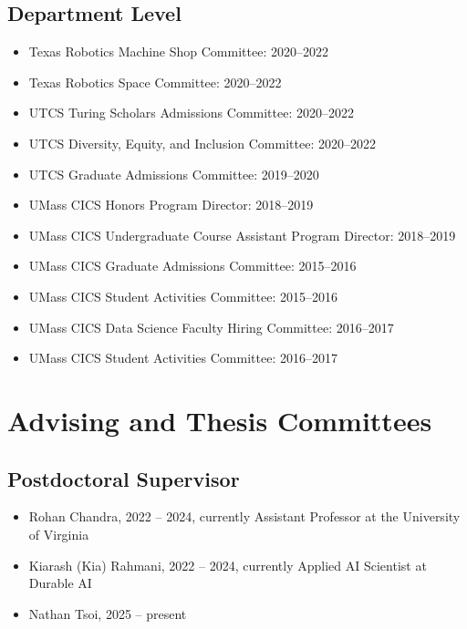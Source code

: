 \documentclass[Times]{article}
\begin{document}
\subsection*{Department Level}
\begin{itemize}
 \item Texas Robotics Machine Shop Committee: 2020--2022
 \item Texas Robotics Space Committee: 2020--2022
 \item UTCS Turing Scholars Admissions Committee: 2020--2022
 \item UTCS Diversity, Equity, and Inclusion Committee: 2020--2022
 \item UTCS Graduate Admissions Committee: 2019--2020
 \item UMass CICS Honors Program Director: 2018--2019
 \item UMass CICS Undergraduate Course Assistant Program Director: 2018--2019
 \item UMass CICS Graduate Admissions Committee: 2015--2016
 \item UMass CICS Student Activities Committee: 2015--2016
 \item UMass CICS Data Science Faculty Hiring Committee: 2016--2017
 \item UMass CICS Student Activities Committee: 2016--2017
\end{itemize}

\section*{Advising and Thesis Committees}

\subsection*{Postdoctoral Supervisor}
\begin{itemize}
 \item Rohan Chandra, 2022 -- 2024, currently Assistant Professor at the University of Virginia
 \item Kiarash (Kia) Rahmani, 2022 -- 2024, currently Applied AI Scientist at Durable AI
 \item Nathan Tsoi, 2025 -- present
\end{itemize}
\end{document}
